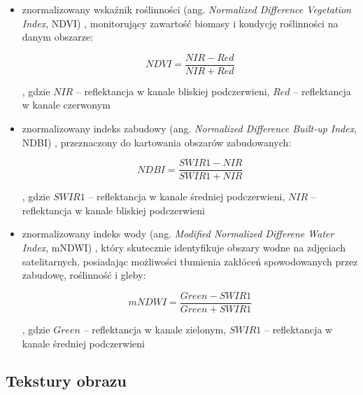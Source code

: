 \documentclass{amuthesis}
\begin{document}
\begin{itemize}
\item
  znormalizowany wskaźnik roślinności (ang. \emph{Normalized Difference
  Vegetation Index}, NDVI) \autocite{ndvi}, monitorujący zawartość
  biomasy i kondycję roślinności na danym obszarze:

  \[
  NDVI = \frac{NIR - Red}{NIR + Red}
  \]

  , gdzie \(NIR\) -- reflektancja w kanale bliskiej podczerwieni,
  \(Red\) -- reflektancja w kanale czerwonym
\item
  znormalizowany indeks zabudowy (ang. \emph{Normalized Difference
  Built-up Index}, NDBI) \autocite{ndbi}, przeznaczony do kartowania
  obszarów zabudowanych:

  \[
  NDBI = \frac{SWIR1 - NIR}{SWIR1 + NIR}
  \]

  , gdzie \(SWIR1\) -- reflektancja w kanale średniej podczerwieni,
  \(NIR\) -- reflektancja w kanale bliskiej podczerwieni
\item
  znormalizowany indeks wody (ang. \emph{Modified Normalized Differene
  Water Index}, mNDWI) \autocite{mndwi}, który skutecznie identyfikuje
  obszary wodne na zdjęciach satelitarnych, posiadając możliwości
  tłumienia zakłóceń spowodowanych przez zabudowę, roślinność i gleby:

  \[
  mNDWI = \frac{Green - SWIR1}{Green + SWIR1}
  \]

  , gdzie \(Green\) -- reflektancja w kanale zielonym, \(SWIR1\) --
  reflektancja w kanale średniej podczerwieni
\end{itemize}

\hypertarget{tekstury-obrazu}{%
\subsection{Tekstury obrazu}\label{tekstury-obrazu}}
\end{document}
